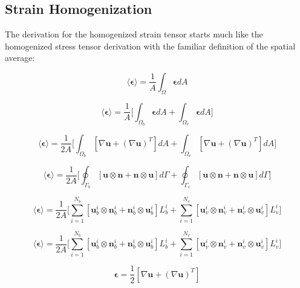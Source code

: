 \subsection{Strain Homogenization}
The derivation for the homogenized strain tensor starts much like the homogenized stress tensor derivation with the familiar definition of the spatial average:

\begin{equation}
\label{eqn:strain2}
\langle \boldsymbol{\epsilon} \rangle = 
\frac{1}{A} \int_\Omega \boldsymbol{\epsilon} {dA}
\end{equation}

\begin{equation}
\label{eqn:strain3}
\langle \boldsymbol{\epsilon} \rangle = 
\frac{1}{A} \bigg \lbrack {\int_{\Omega_{b}} \boldsymbol{\epsilon} { dA} + 
\int_{\Omega_{v}} \boldsymbol{\epsilon} {dA}} \bigg \rbrack
\end{equation}

\begin{equation}
\label{eqn:strain4}
\langle \boldsymbol{\epsilon} \rangle = 
\frac{1}{2 A} \bigg \lbrack {\int_{\Omega_{b}} \left[ \nabla \mathbf{u} + 
\left( \nabla \mathbf{u} \right)^{T} \right] {dA} +
\int_{\Omega_{v}} \left[ \nabla \mathbf{u} + 
\left( \nabla \mathbf{u} \right)^{T} \right] {dA}} \bigg \rbrack
\end{equation}

\begin{equation}
\label{eqn:strain5}
\langle \boldsymbol{\epsilon} \rangle = 
\frac{1}{2 A} \bigg \lbrack {\oint_{\Gamma_{b}} \left[ \mathbf{u} \otimes \mathbf{n} + 
\mathbf{n} \otimes \mathbf{u} \right] {d \Gamma} +
\oint_{\Gamma_{v}} \left[ \mathbf{u} \otimes \mathbf{n} + 
\mathbf{n} \otimes \mathbf{u} \right] { d \Gamma}} \bigg \rbrack
\end{equation}

\begin{equation}
\label{eqn:strain6}
\langle \boldsymbol{\epsilon} \rangle = 
\frac{1}{2 A} \bigg \lbrack {\sum_{i=1}^{N_{b}} \left[ \mathbf{u}_{b}^i \otimes \mathbf{n}_{b}^i + 
\mathbf{n}_{b}^i \otimes \mathbf{u}_{b}^i \right] {L_{b}^i} +
\sum_{i=1}^{N_{v}} \left[ \mathbf{u}_{v}^i \otimes \mathbf{n}_{v}^i + 
\mathbf{n}_{v}^i \otimes \mathbf{u}_{v}^i \right] {L_{v}^i}} \bigg \rbrack
\end{equation}

\begin{equation}
\label{eqn:strain7}
\langle \boldsymbol{\epsilon} \rangle = 
\frac{1}{2 A} \bigg \lbrack {\sum_{i=1}^{N_{b}} \left[ \mathbf{u}_{b}^i \otimes \mathbf{n}_{b}^i + 
\mathbf{n}_{b}^i \otimes \mathbf{u}_{b}^i \right] {L_{b}^i} +
\sum_{i=1}^{N_{v}} \left[ \mathbf{u}_{v}^i \otimes \mathbf{n}_{v}^i + 
\mathbf{n}_{v}^i \otimes \mathbf{u}_{v}^i \right] {L_{v}^i}} \bigg \rbrack
\end{equation}






\begin{equation}
\label{eqn:strain1}
\boldsymbol{\epsilon} = 
\frac{1}{2}  \left[ \nabla \mathbf{u} + \left( \nabla \mathbf{u} \right)^{T} \right]
\end{equation}